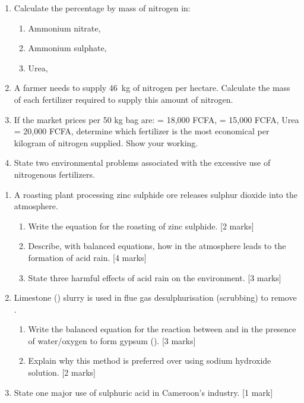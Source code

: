 \documentclass[11pt]{article}
\newcounter{popsec}
\newcounter{popsub}
\newcommand{\courssub}[1]{%
  \stepcounter{popsub}%
  \par\vspace{9pt}\noindent{\popxbold\fontsize{11.5}{13}\selectfont\color{popink}{\color{poporange}\thepopsec.\thepopsub}\hspace{6pt}#1}\par\nopagebreak\vspace{4pt}
}
\begin{document}
\begin{exercice}
\begin{enumerate}
\item Calculate the percentage by mass of nitrogen in:
      \begin{enumerate}[label=(\alph*)]
      \item Ammonium nitrate, 
      \item Ammonium sulphate, 
      \item Urea, 
      \end{enumerate}
\item A farmer needs to supply \SI{46}{\kilo\gram} of nitrogen per hectare. Calculate the mass of each fertilizer required to supply this amount of nitrogen.
\item If the market prices per 50 kg bag are:  = 18,000 FCFA,  = 15,000 FCFA, Urea = 20,000 FCFA, determine which fertilizer is the most economical per kilogram of nitrogen supplied. Show your working.
\item State two environmental problems associated with the excessive use of nitrogenous fertilizers.
\end{enumerate}
\end{exercice}

\courssub{I prepare for the GCE}

\begin{exercice}
\begin{enumerate}
\item A roasting plant processing zinc sulphide ore releases sulphur dioxide into the atmosphere.
      \begin{enumerate}[label=(\alph*)]
      \item Write the equation for the roasting of zinc sulphide. [2 marks]
      \item Describe, with balanced equations, how  in the atmosphere leads to the formation of acid rain. [4 marks]
      \item State three harmful effects of acid rain on the environment. [3 marks]
      \end{enumerate}
\item Limestone () slurry is used in flue gas desulphurisation (scrubbing) to remove .
      \begin{enumerate}[label=(\alph*)]
      \item Write the balanced equation for the reaction between  and  in the presence of water/oxygen to form gypsum (). [3 marks]
      \item Explain why this method is preferred over using sodium hydroxide solution. [2 marks]
      \end{enumerate}
\item State one major use of sulphuric acid in Cameroon's industry. [1 mark]
\end{enumerate}
\end{exercice}
\end{document}
